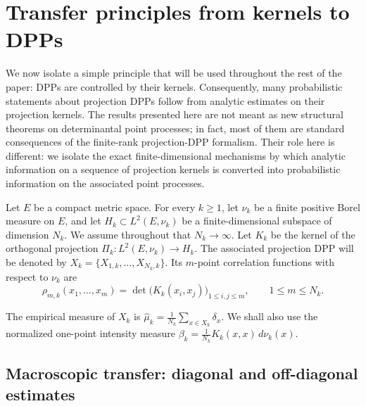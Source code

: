 \documentclass[12pt,a4paper,reqno]{article}
\theoremstyle{thmstyleone}
\theoremstyle{thmstylethree}
\theoremstyle{thmstyletwo}
\numberwithin{equation}{subsection}
\def\geq{\geqslant}
\def\leq{\leqslant}
\begin{document}
\section{Transfer principles from kernels to DPPs}
\label{sec:black-box-transfer}

We now isolate a simple principle that will be used throughout the rest of the paper: DPPs are controlled by their kernels. Consequently, many probabilistic statements about projection DPPs follow from analytic estimates on their projection kernels. The results presented here are not meant as new structural theorems on determinantal point processes; in fact, most of them are standard consequences of the finite-rank projection-DPP formalism. Their role here is different: we isolate the exact finite-dimensional mechanisms by which analytic information on a sequence of projection kernels is converted into probabilistic information on the associated point processes.


Let $E$ be a compact metric space. For every $k\geq 1$, let $\nu_k$ be a finite positive Borel measure on $E$, and let $H_k\subset L^2(E,\nu_k)$ be a finite-dimensional subspace of dimension $N_k$. We assume throughout that $N_k\longrightarrow\infty.$ Let $K_k$ be the kernel of the orthogonal projection $\Pi_k:L^2(E,\nu_k)\longrightarrow H_k.$ The associated projection DPP will be denoted by $X_k=\{X_{1,k},\ldots,X_{N_k,k}\}.$ Its $m$-point correlation functions with respect to $\nu_k$ are
\[
    \rho_{m,k}(x_1,\ldots,x_m)
    =
    \det\big(K_k(x_i,x_j)\big)_{1\leq i,j\leq m},
    \qquad 1\leq m\leq N_k.
\]

The empirical measure of $X_k$ is $\widehat\mu_k=\frac{1}{N_k}\sum_{x\in X_k}\delta_x.$ We shall also use the normalized one-point intensity measure $\beta_k=\frac{1}{N_k}K_k(x,x)\,d\nu_k(x).$


\subsection{Macroscopic transfer: diagonal and off-diagonal estimates}
\end{document}
